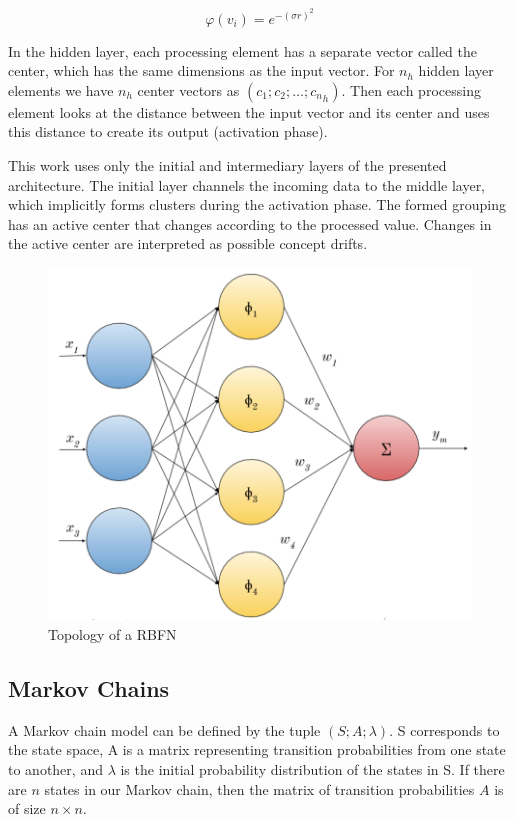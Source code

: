 \documentclass[preprint,12pt]{elsarticle}
\begin{document}
\begin{equation}
    \label{eq:gaussian}
    \varphi (v_{i})=e^{-(\sigma r)^{2}}
\end{equation}

In the hidden layer, each processing element has a separate vector called the center, which has the same dimensions as the input vector.
For $n_h$ hidden layer elements we have $n_h$ center vectors as $(c_1; c_2; \ldots; {c_n}_h)$.
Then each processing element looks at the distance between the input vector and its center and uses this distance to create its output (activation phase).


This work uses only the initial and intermediary layers of the presented architecture.
The initial layer channels the incoming data to the middle layer, which implicitly forms clusters during the activation phase.
The formed grouping has an active center that changes according to the processed value.
Changes in the active center are interpreted as possible concept drifts.

\begin{figure}[h!]
\begin{center}
    \includegraphics[scale=0.75]{img/rbf_arq.png}
    \caption{Topology of a RBFN}
    \label{fig:rbg_arq}
\end{center}
\end{figure}


\subsection{Markov Chains}

A Markov chain model can be defined by the tuple $(S; A; \lambda)$. S corresponds to the state space, A is a matrix representing transition probabilities from one state to another, and $\lambda$ is the initial probability distribution of the states in S. If there are $n$ states in our Markov chain, then the
matrix of transition probabilities $A$ is of size $n \times n$.
\end{document}
